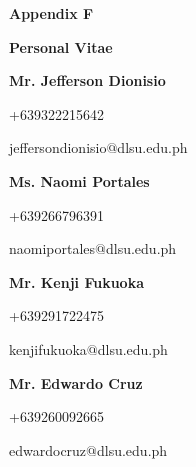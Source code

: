 %
%
%                 

\textbf{\Huge Appendix F}
\bigskip

\textbf{\LARGE Personal Vitae}

\bigskip
\textbf{Mr. Jefferson Dionisio}

+639322215642

jefferson\textunderscore dionisio$@$dlsu.edu.ph

\bigskip
\textbf{Ms. Naomi Portales}

+639266796391

naomi\textunderscore portales$@$dlsu.edu.ph

\bigskip
\textbf{Mr. Kenji Fukuoka}

+639291722475

kenji\textunderscore fukuoka$@$dlsu.edu.ph

\bigskip
\textbf{Mr. Edwardo Cruz}

+639260092665

edwardo\textunderscore cruz$@$dlsu.edu.ph